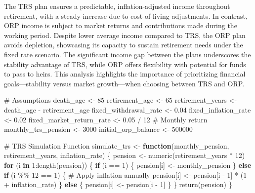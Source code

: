 \documentclass[
  letterpaper,
  DIV=11,
  numbers=noendperiod]{scrartcl}
\newenvironment{Shaded}{\begin{snugshade}}{\end{snugshade}}
\newcommand{\CommentTok}[1]{\textcolor[rgb]{0.37,0.37,0.37}{#1}}
\newcommand{\ControlFlowTok}[1]{\textcolor[rgb]{0.00,0.23,0.31}{\textbf{#1}}}
\newcommand{\DecValTok}[1]{\textcolor[rgb]{0.68,0.00,0.00}{#1}}
\newcommand{\FloatTok}[1]{\textcolor[rgb]{0.68,0.00,0.00}{#1}}
\newcommand{\FunctionTok}[1]{\textcolor[rgb]{0.28,0.35,0.67}{#1}}
\newcommand{\NormalTok}[1]{\textcolor[rgb]{0.00,0.23,0.31}{#1}}
\newcommand{\OtherTok}[1]{\textcolor[rgb]{0.00,0.23,0.31}{#1}}
\newcommand{\SpecialCharTok}[1]{\textcolor[rgb]{0.37,0.37,0.37}{#1}}
\begin{document}
The TRS plan ensures a predictable, inflation-adjusted income throughout
retirement, with a steady increase due to cost-of-living adjustments. In
contrast, ORP income is subject to market returns and contributions made
during the working period. Despite lower average income compared to TRS,
the ORP plan avoids depletion, showcasing its capacity to sustain
retirement needs under the fixed rate scenario. The significant income
gap between the plans underscores the stability advantage of TRS, while
ORP offers flexibility with potential for funds to pass to heirs. This
analysis highlights the importance of prioritizing financial
goals---stability versus market growth---when choosing between TRS and
ORP.

\begin{Shaded}
\begin{Highlighting}[]
\CommentTok{\# Assumptions}
\NormalTok{death\_age }\OtherTok{\textless{}{-}} \DecValTok{85}
\NormalTok{retirement\_age }\OtherTok{\textless{}{-}} \DecValTok{65}
\NormalTok{retirement\_years }\OtherTok{\textless{}{-}}\NormalTok{ death\_age }\SpecialCharTok{{-}}\NormalTok{ retirement\_age}
\NormalTok{fixed\_withdrawal\_rate }\OtherTok{\textless{}{-}} \FloatTok{0.04}
\NormalTok{fixed\_inflation\_rate }\OtherTok{\textless{}{-}} \FloatTok{0.02}
\NormalTok{fixed\_market\_return\_rate }\OtherTok{\textless{}{-}} \FloatTok{0.05} \SpecialCharTok{/} \DecValTok{12}  \CommentTok{\# Monthly return}
\NormalTok{monthly\_trs\_pension }\OtherTok{\textless{}{-}} \DecValTok{3000}
\NormalTok{initial\_orp\_balance }\OtherTok{\textless{}{-}} \DecValTok{500000}

\CommentTok{\# TRS Simulation Function}
\NormalTok{simulate\_trs }\OtherTok{\textless{}{-}} \ControlFlowTok{function}\NormalTok{(monthly\_pension, retirement\_years, inflation\_rate) \{}
\NormalTok{  pension }\OtherTok{\textless{}{-}} \FunctionTok{numeric}\NormalTok{(retirement\_years }\SpecialCharTok{*} \DecValTok{12}\NormalTok{)}
  \ControlFlowTok{for}\NormalTok{ (i }\ControlFlowTok{in} \DecValTok{1}\SpecialCharTok{:}\FunctionTok{length}\NormalTok{(pension)) \{}
    \ControlFlowTok{if}\NormalTok{ (i }\SpecialCharTok{==} \DecValTok{1}\NormalTok{) \{}
\NormalTok{      pension[i] }\OtherTok{\textless{}{-}}\NormalTok{ monthly\_pension}
\NormalTok{    \} }\ControlFlowTok{else} \ControlFlowTok{if}\NormalTok{ (i }\SpecialCharTok{\%\%} \DecValTok{12} \SpecialCharTok{==} \DecValTok{1}\NormalTok{) \{  }\CommentTok{\# Apply inflation annually}
\NormalTok{      pension[i] }\OtherTok{\textless{}{-}}\NormalTok{ pension[i }\SpecialCharTok{{-}} \DecValTok{1}\NormalTok{] }\SpecialCharTok{*}\NormalTok{ (}\DecValTok{1} \SpecialCharTok{+}\NormalTok{ inflation\_rate)}
\NormalTok{    \} }\ControlFlowTok{else}\NormalTok{ \{}
\NormalTok{      pension[i] }\OtherTok{\textless{}{-}}\NormalTok{ pension[i }\SpecialCharTok{{-}} \DecValTok{1}\NormalTok{]}
\NormalTok{    \}}
\NormalTok{  \}}
  \FunctionTok{return}\NormalTok{(pension)}
\NormalTok{\}}


\end{Highlighting}
\end{Shaded}
\end{document}
